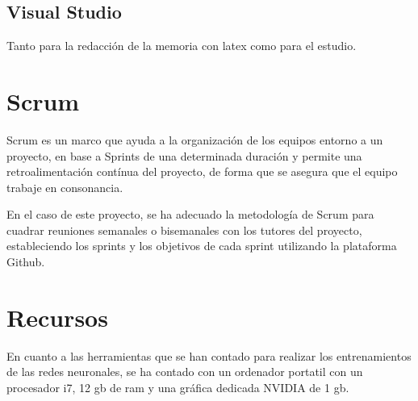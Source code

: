 \subsection{Visual Studio}

Tanto para la redacción de la memoria con latex como para el estudio.

\section{Scrum}
Scrum es un marco que ayuda a la organización de los equipos entorno a un proyecto, en base a Sprints de una determinada duración y permite una retroalimentación
contínua del proyecto, de forma que se asegura que el equipo trabaje en consonancia.

En el caso de este proyecto, se ha adecuado la metodología de Scrum para cuadrar reuniones semanales o bisemanales con los tutores del proyecto, estableciendo
los sprints y los objetivos de cada sprint utilizando la plataforma Github.

\section{Recursos}

En cuanto a las herramientas que se han contado para realizar los entrenamientos de las redes neuronales, se ha contado con un ordenador portatil con un procesador
i7, 12 gb de ram y una gráfica dedicada NVIDIA de 1 gb.





